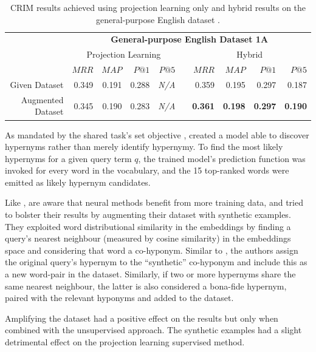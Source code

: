 \begin{table}\centering
    \begin{tabular}{@{}rrrrrcrrrr@{}} \toprule
    & \multicolumn{9}{c}{\textbf{General-purpose English Dataset 1A}} \\ \cmidrule{2-10} 
    & \multicolumn{4}{c}{Projection Learning} & \phantom{a} & \multicolumn{4}{c}{Hybrid} \\
    \cmidrule{2-5} \cmidrule{7-10}
    & $MRR$ & $MAP$ & $P@1$ & $P@5$ && $MRR$ & $MAP$ & $P@1$ & $P@5$ \\ \midrule
    Given Dataset & 0.349 & 0.191 & 0.288 & \textit{N/A} && 0.359 & 0.195 & 0.297 & 0.187 \\
    Augmented Dataset & 0.345 & 0.190 & 0.283 & \textit{N/A} && \textbf{0.361} & \textbf{0.198} & \textbf{0.297} & \textbf{0.190} \\
    \bottomrule
    \end{tabular}
    \caption{\ac{CRIM} results achieved using projection learning only and hybrid results on the general-purpose English dataset \citep{bernier2018crim}.}\label{tab:CRIM_results}
\end{table}

As mandated by the shared task's  set objective \citep{camacho2018semeval}, \citep{bernier2018crim} created a model able to discover hypernyms rather than merely identify hypernymy.  To find the most likely hypernyms for a given query term $q$, the trained model's prediction function was invoked for every word in the vocabulary, and the 15 top-ranked words were emitted as likely hypernym candidates.

Like \citep{espinosa2016supervised}, \citeauthor{bernier2018crim} are aware that neural methods benefit from more training data, and tried to bolster their results by augmenting their dataset with synthetic examples.  They exploited word distributional similarity in the embeddings by finding a query’s nearest neighbour (measured by cosine similarity) in the embeddings space and considering that word a co-hyponym.  Similar to \citep{Snow2004, ritter2009anyway}, the authors assign the original query’s hypernym to the “synthetic” co-hyponym and include this as a new word-pair in the dataset.  Similarly, if two or more hypernyms share the same nearest neighbour, the latter is also considered a bona-fide hypernym, paired with the relevant hyponyms and added to the dataset.  

Amplifying the dataset had a positive effect on the results but only when combined with the unsupervised approach.  The synthetic examples had a slight detrimental effect on the projection learning supervised method.


